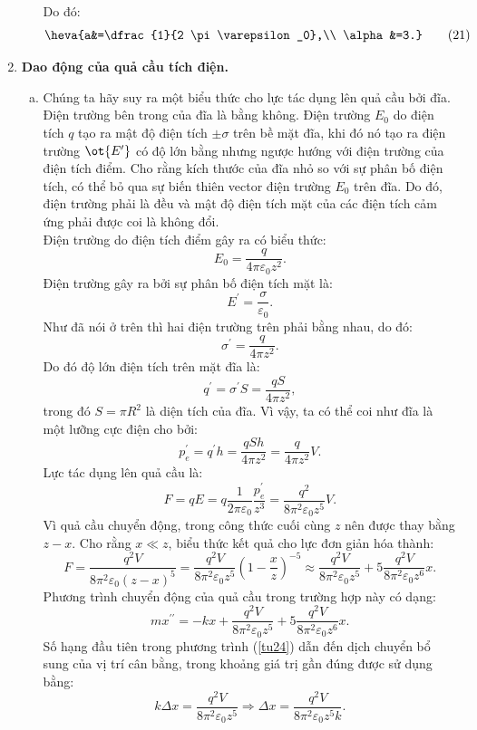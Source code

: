 \begin{loigiai}
\begin{enumerate}[1)]
\begin{enumerate}[a)]
\[\]
Do đó:
\[\heva{a&=\dfrac{1}{2 \pi \varepsilon_0},\\
    \alpha&=3.}\tag{21} \]
\end{enumerate}
\item \textbf{Dao động của quả cầu tích điện.}
\begin{enumerate}[a)]
    \item Chúng ta hãy suy ra một biểu thức cho lực tác dụng lên quả cầu bởi đĩa.\\
    Điện trường bên trong của đĩa là bằng không. Điện trường $E_0$ do điện tích $q$ tạo ra mật độ điện tích $\pm \sigma$ trên bề mặt đĩa, khi đó nó tạo ra điện trường $\ot{E^\prime}$ có độ lớn bằng nhưng ngược hướng với điện trường của điện tích điểm. Cho rằng kích thước của đĩa nhỏ so với sự phân bố điện tích, có thể bỏ qua sự biến thiên vector điện trường $E_0$ trên đĩa. Do đó, điện trường phải là đều và mật độ điện tích mặt của các điện tích cảm ứng phải được coi là không đổi.\\
    Điện trường do điện tích điểm gây ra có biểu thức:
    \[E_0=\dfrac{q}{4 \pi \varepsilon_0 z^2}.\]
    Điện trường gây ra bởi sự phân bố điện tích mặt là:
    \[
E^{\prime}=\dfrac{\sigma}{\varepsilon_{0}}.
\]
Như đã nói ở trên thì hai điện trường trên phải bằng nhau, do đó:
\[
\sigma^{\prime}=\dfrac{q}{4 \pi z^{2}}.
\]
Do đó độ lớn điện tích trên mặt đĩa là:
\[ q^\prime=\sigma^ \prime S =\dfrac{qS}{4 \pi z^2}, \]
trong đó $S=\pi R^2$ là diện tích của đĩa. Vì vậy, ta có thể coi như đĩa là một lưỡng cực điện cho bởi:
\[
p_{e}^{\prime}=q^{\prime} h=\dfrac{q S h}{4 \pi z^{2}}=\dfrac{q}{4 \pi z^{2}} V. \tag{22}
\]
Lực tác dụng lên quả cầu là:
\[
F=q E=q \dfrac{1}{2 \pi \varepsilon_{0}} \dfrac{p_{e}^{\prime}}{z^{3}}=\dfrac{q^{2}}{8 \pi^{2} \varepsilon_{0} z^{5}} V. \tag{23}
\]
Vì quả cầu chuyển động, trong công thức cuối cùng $z$ nên được thay bằng $z-x$. Cho rằng $x \ll z$, biểu thức kết quả cho lực đơn giản hóa thành:
\[
F=\dfrac{q^{2} V}{8 \pi^{2} \varepsilon_{0}(z-x)^{5}}=\dfrac{q^{2} V}{8 \pi^{2} \varepsilon_{0} z^{5}}\left(1-\dfrac{x}{z}\right)^{-5} \approx \dfrac{q^{2} V}{8 \pi^{2} \varepsilon_{0} z^{5}}+5 \dfrac{q^{2} V}{8 \pi^{2} \varepsilon_{0} z^{6}} x. \tag{24} \label{tu24}
\]
Phương trình chuyển động của quả cầu trong trường hợp này có dạng:
\[
m x^{\prime \prime}=-k x+\dfrac{q^{2} V}{8 \pi^{2} \varepsilon_{0} z^{5}}+5 \dfrac{q^{2} V}{8 \pi^{2} \varepsilon_{0} z^{6}} x. \tag{25}
\]
Số hạng đầu tiên trong phương trình (\ref{tu24}) dẫn đến dịch chuyển bổ sung của vị trí cân bằng, trong khoảng giá trị gần đúng được sử dụng bằng:
\[
k \Delta x=\dfrac{q^{2} V}{8 \pi^{2} \varepsilon_{0} z^{5}} \Rightarrow \Delta x=\dfrac{q^{2} V}{8 \pi^{2} \varepsilon_{0} z^{5} k}. \tag{26}
\]
\end{enumerate}
\end{enumerate}
\end{loigiai}
